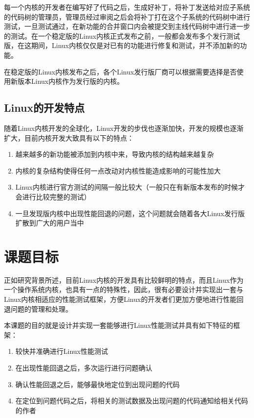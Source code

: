 每一个内核的开发者在编写好了代码之后，生成好补丁，将补丁发送给对应子系统的代码树的管理员，管理员经过审阅之后会将补丁打在这个子系统的代码树中进行测试，一旦测试通过，在新功能的合并窗口内会被提交到主线代码树中进行进一步的测试。在一个稳定版的Linux内核正式发布之前，一般都会发布多个发行测试版，在这期间，Linux内核仅仅是对已有的功能进行修复和测试，并不添加新的功能。

在稳定版的Linux内核发布之后，各个Linux发行版厂商可以根据需要选择是否使用新版本Linux内核作为发行版的内核。

\subsection{Linux的开发特点}

随着Linux内核开发的全球化，Linux开发的步伐也逐渐加快，开发的规模也逐渐扩大，目前内核开发大致具有以下的特点：

\begin{enumerate}
\item 越来越多的新功能被添加到内核中来，导致内核的结构越来越复杂
\item 内核的复杂结构使得任何一点改动对内核性能造成影响的可能性加大
\item Linux内核进行官方测试的间隔一般比较大（一般只在有新版本发布的时候才会进行比较完整的测试）
\item 一旦发现版内核中出现性能回退的问题，这个问题就会随着各大Linux发行版扩散到广大的用户当中
\end{enumerate}

\section{课题目标}

正如研究背景所述，目前Linux内核的开发具有比较鲜明的特点，而且Linux作为一个操作系统内核，也具有一点的特殊性，因此，很有必要设计并实现出一套与Linux内核相适应的性能测试框架，方便Linux的开发者们更加方便地进行性能回退问题的管理和处理。

本课题的目的就是设计并实现一套能够进行Linux性能测试并具有如下特征的框架：

\begin{enumerate}
\item 较快并准确进行Linux性能测试
\item 在出现性能回退之后，多次运行进行问题确认
\item 确认性能回退之后，能够最快地定位到出现问题的代码
\item 在定位到问题代码之后，将相关的测试数据及出现问题的代码通知给相关代码的作者
\end{enumerate}